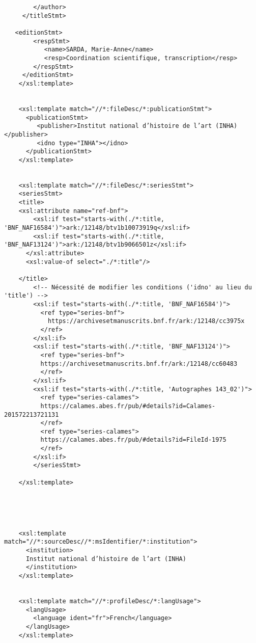 \begin{verbatim}
        </author>        
     </titleStmt>
     
   <editionStmt>        
        <respStmt>
           <name>SARDA, Marie-Anne</name>
           <resp>Coordination scientifique, transcription</resp>
        </respStmt>        
     </editionStmt>     
    </xsl:template>

    
    <xsl:template match="//*:fileDesc/*:publicationStmt">
      <publicationStmt>
         <publisher>Institut national d’histoire de l’art (INHA)</publisher>         
         <idno type="INHA"></idno>         
      </publicationStmt>
    </xsl:template>

    
    <xsl:template match="//*:fileDesc/*:seriesStmt">
    <seriesStmt>
    <title>
    <xsl:attribute name="ref-bnf">
        <xsl:if test="starts-with(./*:title, 'BNF_NAF16584')">ark:/12148/btv1b10073919q</xsl:if>
        <xsl:if test="starts-with(./*:title, 'BNF_NAF13124')">ark:/12148/btv1b9066501z</xsl:if>        
      </xsl:attribute>
      <xsl:value-of select="./*:title"/>   
         
    </title>
        <!-- Nécessité de modifier les conditions ('idno' au lieu du 'title') -->          
        <xsl:if test="starts-with(./*:title, 'BNF_NAF16584')">
          <ref type="series-bnf">
            https://archivesetmanuscrits.bnf.fr/ark:/12148/cc3975x
          </ref>
        </xsl:if>
        <xsl:if test="starts-with(./*:title, 'BNF_NAF13124')">
          <ref type="series-bnf">
          https://archivesetmanuscrits.bnf.fr/ark:/12148/cc60483
          </ref>
        </xsl:if>
        <xsl:if test="starts-with(./*:title, 'Autographes 143_02')">
          <ref type="series-calames">
          https://calames.abes.fr/pub/#details?id=Calames-201572213721131
          </ref>
          <ref type="series-calames">
          https://calames.abes.fr/pub/#details?id=FileId-1975
          </ref>
        </xsl:if>         
        </seriesStmt>         
    
    </xsl:template>
    
  
   

   
    <xsl:template match="//*:sourceDesc//*:msIdentifier/*:institution">
      <institution>
      Institut national d’histoire de l’art (INHA)
      </institution>
    </xsl:template>

   
    <xsl:template match="//*:profileDesc/*:langUsage">
      <langUsage>
        <language ident="fr">French</language>
      </langUsage> 
    </xsl:template> 
    

\end{verbatim}
